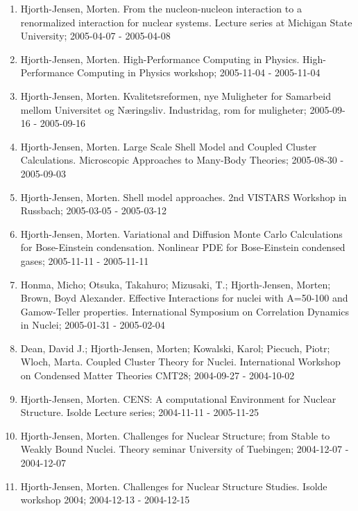 \documentclass[a4wide,10pt]{article}
\begin{document}
\begin{enumerate}
\item Hjorth-Jensen, Morten.  From the nucleon-nucleon interaction to a renormalized interaction for nuclear systems. Lecture series at Michigan State University; 2005-04-07 - 2005-04-08

\item Hjorth-Jensen, Morten.  High-Performance Computing in Physics. High-Performance Computing in Physics workshop; 2005-11-04 - 2005-11-04

\item Hjorth-Jensen, Morten.  Kvalitetsreformen, nye Muligheter for Samarbeid mellom Universitet og Næringsliv. Industridag, rom for muligheter; 2005-09-16 - 2005-09-16

\item Hjorth-Jensen, Morten.  Large Scale Shell Model and Coupled Cluster Calculations. Microscopic Approaches to Many-Body Theories; 2005-08-30 - 2005-09-03

\item Hjorth-Jensen, Morten.  Shell model approaches. 2nd VISTARS Workshop in Russbach; 2005-03-05 - 2005-03-12

\item Hjorth-Jensen, Morten.  Variational and Diffusion Monte Carlo Calculations for Bose-Einstein condensation. Nonlinear PDE for Bose-Einstein condensed gases; 2005-11-11 - 2005-11-11

\item Honma, Micho; Otsuka, Takahuro; Mizusaki, T.; Hjorth-Jensen, Morten; Brown, Boyd Alexander. Effective Interactions for nuclei with A=50-100 and Gamow-Teller properties. International Symposium on Correlation Dynamics in Nuclei; 2005-01-31 - 2005-02-04

\item Dean, David J.; Hjorth-Jensen, Morten; Kowalski, Karol; Piecuch, Piotr; Wloch, Marta. Coupled Cluster Theory for Nuclei. International Workshop on Condensed Matter Theories CMT28; 2004-09-27 - 2004-10-02

\item Hjorth-Jensen, Morten. CENS: A computational Environment for Nuclear Structure. Isolde Lecture series; 2004-11-11 - 2005-11-25

\item Hjorth-Jensen, Morten.  Challenges for Nuclear Structure; from Stable to Weakly Bound Nuclei. Theory seminar University of Tuebingen; 2004-12-07 - 2004-12-07

\item Hjorth-Jensen, Morten.  Challenges for Nuclear Structure Studies. Isolde workshop 2004; 2004-12-13 - 2004-12-15


\end{enumerate}
\end{document}
